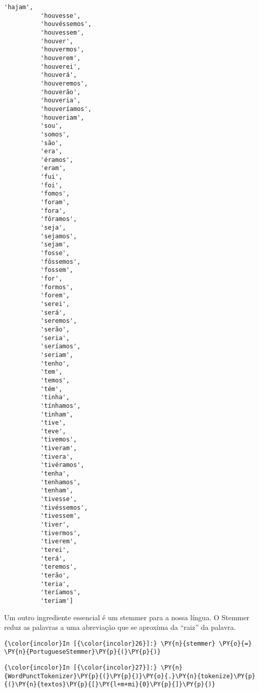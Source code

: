 \begin{Verbatim}[commandchars=\\\{\}]
          'hajam',
          'houvesse',
          'houvéssemos',
          'houvessem',
          'houver',
          'houvermos',
          'houverem',
          'houverei',
          'houverá',
          'houveremos',
          'houverão',
          'houveria',
          'houveríamos',
          'houveriam',
          'sou',
          'somos',
          'são',
          'era',
          'éramos',
          'eram',
          'fui',
          'foi',
          'fomos',
          'foram',
          'fora',
          'fôramos',
          'seja',
          'sejamos',
          'sejam',
          'fosse',
          'fôssemos',
          'fossem',
          'for',
          'formos',
          'forem',
          'serei',
          'será',
          'seremos',
          'serão',
          'seria',
          'seríamos',
          'seriam',
          'tenho',
          'tem',
          'temos',
          'tém',
          'tinha',
          'tínhamos',
          'tinham',
          'tive',
          'teve',
          'tivemos',
          'tiveram',
          'tivera',
          'tivéramos',
          'tenha',
          'tenhamos',
          'tenham',
          'tivesse',
          'tivéssemos',
          'tivessem',
          'tiver',
          'tivermos',
          'tiverem',
          'terei',
          'terá',
          'teremos',
          'terão',
          'teria',
          'teríamos',
          'teriam']
\end{Verbatim}
        
    Um outro ingrediente essencial é um stemmer para a nossa língua. O
Stemmer reduz as palavras a uma abreviação que se aproxima da ``raiz''
da palavra.

    \begin{Verbatim}[commandchars=\\\{\}]
{\color{incolor}In [{\color{incolor}26}]:} \PY{n}{stemmer} \PY{o}{=} \PY{n}{PortugueseStemmer}\PY{p}{(}\PY{p}{)}
\end{Verbatim}

    \begin{Verbatim}[commandchars=\\\{\}]
{\color{incolor}In [{\color{incolor}27}]:} \PY{n}{WordPunctTokenizer}\PY{p}{(}\PY{p}{)}\PY{o}{.}\PY{n}{tokenize}\PY{p}{(}\PY{n}{textos}\PY{p}{[}\PY{l+m+mi}{0}\PY{p}{]}\PY{p}{)}
\end{Verbatim}

